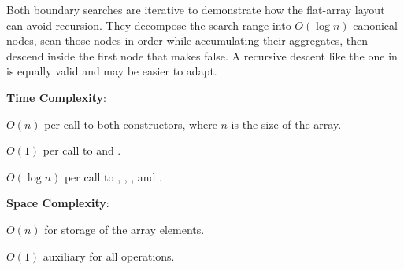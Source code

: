 Both boundary searches are iterative to demonstrate how the flat-array layout can avoid recursion. They decompose the search range into $O(\log n)$ canonical nodes, scan those nodes in order while accumulating their aggregates, then descend inside the first node that makes  false. A recursive descent like the one in  is equally valid and may be easier to adapt.

\textbf{Time Complexity}:
\begin{compactitem}
  \item $O(n)$ per call to both constructors, where $n$ is the size of the array.
  \item $O(1)$ per call to  and .
  \item $O(\log n)$ per call to , , , and .
\end{compactitem}

\textbf{Space Complexity}:
\begin{compactitem}
  \item $O(n)$ for storage of the array elements.
  \item $O(1)$ auxiliary for all operations.
\end{compactitem}

